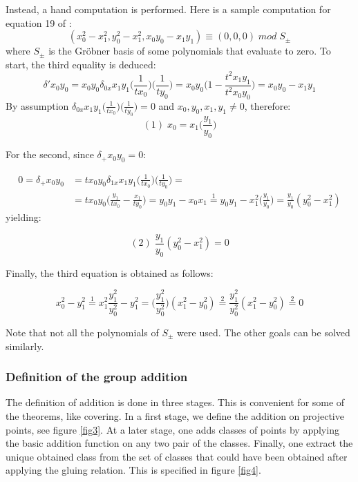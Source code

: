 \documentclass[runningheads]{llncs}
\begin{document}
Instead, a hand computation is performed. Here is a sample computation for equation 19 of \cite{hales2016group}: $$(x_0^2 - x_1^2,y_0^2 - x_1^2,x_0y_0 - x_1 y_1) \equiv (0,0,0) \; mod \; S_{\pm}$$ where $S_{\pm}$ is the Gr\"{o}bner basis of some polynomials that evaluate to zero. To start, the third equality is deduced: $$\delta' x_0 y_0  = x_0 y_0 \delta_{0x} x_1 y_1 \Big(\frac{1}{t x_0}\Big) \Big(\frac{1}{t y_0}\Big) = 
x_0 y_0 \Big(1 - \frac{t^2 x_1 y_1}{t^2 x_0 y_0}\Big) = x_0y_0 - x_1 y_1$$ By assumption $\delta_{0x} x_1 y_1 \Big(\frac{1}{t x_0}\Big) \Big(\frac{1}{t y_0}\Big) = 0$ and $x_0,y_0,x_1,y_1 \neq 0$, therefore: $$(1) \; x_0 = x_1 \Big(\frac{y_1}{y_0}\Big)$$

For the second, since $\delta_{+} x_0 y_0 = 0$: 

\begin{align*}
0 = \delta_{+} x_0 y_0 &= t x_0 y_0 \delta_{1x} x_1 y_1 \Big(\frac{1}{tx_0}\Big) \Big(\frac{1}{ty_0}\Big) = \\ &= t x_0 y_0 \Big(\frac{y_1}{t x_0} - \frac{x_1}{t y_0}\Big) = y_0 y_1 - x_0 x_1 
\stackrel{1}{=} y_0 y_1 - x_1^2 \Big(\frac{y_1}{y_0}\Big) = \frac{y_1}{y_0} (y_0^2 - x_1^2)
\end{align*} yielding:

$$(2) \; \frac{y_1}{y_0} (y_0^2 - x_1^2) = 0$$

Finally, the third equation is obtained as follows:

$$x_0^2 - y_1^2 \stackrel{1}{=} x_1^2 \frac{y_1^2}{y_0^2} - y_1^2 = \Big(\frac{y_1^2}{y_0^2}\Big) (x_1^2 - y_0^2) \stackrel{2}{=} \frac{y_1^2}{y_0^2} (x_1^2 - y_0^2) \stackrel{2}{=} 0$$

Note that not all the polynomials of $S_{\pm}$ were used. The other goals can be solved similarly.

\subsubsection{Definition of the group addition}

The definition of addition is done in three stages. This is convenient for some of the theorems, like covering. In a first stage, we define the addition on projective points, see figure \ref{fig3}. At a later stage, one adds classes of points by applying the basic addition function on any two pair of the classes. Finally, one extract the unique obtained class from the set of classes that could have been obtained after applying the gluing relation. This is specified in figure \ref{fig4}.
\end{document}
